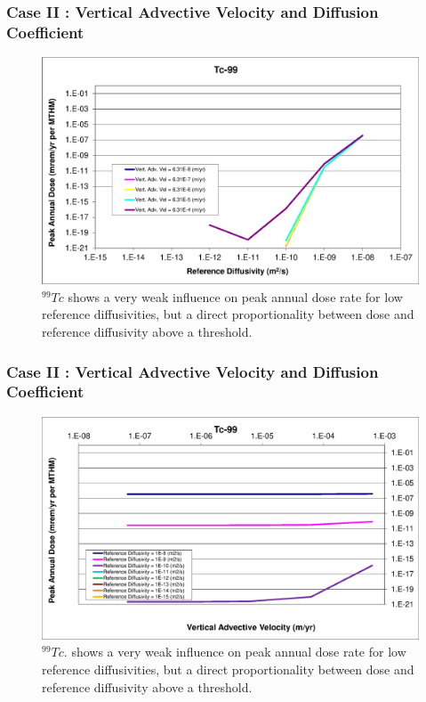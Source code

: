 \begin{frame}[c]
  \frametitle{Case II : Vertical Advective Velocity and Diffusion Coefficient}
\begin{figure}[htp!]
\centering
\includegraphics[width=\linewidth]{AdvVelAndDiffCoeffEBSFail/Tc-99.eps}
\caption{$^{99}Tc$ 
shows a very weak influence on peak annual dose 
rate for low reference diffusivities, but a direct proportionality between 
dose and reference diffusivity above a threshold.}
\label{fig:VAdvVelTc99}
\end{figure}
\end{frame}

\begin{frame}[c]
  \frametitle{Case II : Vertical Advective Velocity and Diffusion Coefficient}
\begin{figure}[ht!]
\centering
\includegraphics[width=\linewidth]{AdvVelAndDiffCoeffEBSFail/Tc-99-VAdvVel.eps}
\caption{$^{99}Tc$.
shows a very weak influence on peak annual dose 
rate for low reference diffusivities, but a direct proportionality between 
dose and reference diffusivity above a threshold.}
\label{fig:VAdvVelTc99VAdvVel}
\end{figure}
\end{frame}


